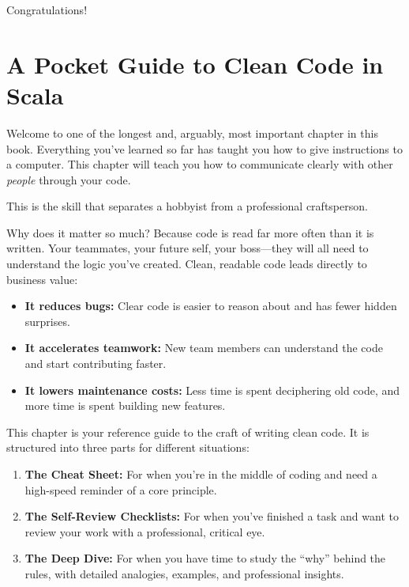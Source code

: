 \documentclass[
  letterpaper,
  DIV=11,
  numbers=noendperiod]{scrreprt}
\providecommand{\tightlist}{%
  \setlength{\itemsep}{0pt}\setlength{\parskip}{0pt}}
\begin{document}
Congratulations!


\chapter{A Pocket Guide to Clean Code in
Scala}\label{a-pocket-guide-to-clean-code-in-scala}

Welcome to one of the longest and, arguably, most important chapter in
this book. Everything you've learned so far has taught you how to give
instructions to a computer. This chapter will teach you how to
communicate clearly with other \emph{people} through your code.

This is the skill that separates a hobbyist from a professional
craftsperson.

Why does it matter so much? Because code is read far more often than it
is written. Your teammates, your future self, your boss---they will all
need to understand the logic you've created. Clean, readable code leads
directly to business value:

\begin{itemize}
\tightlist
\item
  \textbf{It reduces bugs:} Clear code is easier to reason about and has
  fewer hidden surprises.
\item
  \textbf{It accelerates teamwork:} New team members can understand the
  code and start contributing faster.
\item
  \textbf{It lowers maintenance costs:} Less time is spent deciphering
  old code, and more time is spent building new features.
\end{itemize}

This chapter is your reference guide to the craft of writing clean code.
It is structured into three parts for different situations:

\begin{enumerate}
\def\labelenumi{\arabic{enumi}.}
\tightlist
\item
  \textbf{The Cheat Sheet:} For when you're in the middle of coding and
  need a high-speed reminder of a core principle.
\item
  \textbf{The Self-Review Checklists:} For when you've finished a task
  and want to review your work with a professional, critical eye.
\item
  \textbf{The Deep Dive:} For when you have time to study the ``why''
  behind the rules, with detailed analogies, examples, and professional
  insights.
\end{enumerate}
\end{document}
